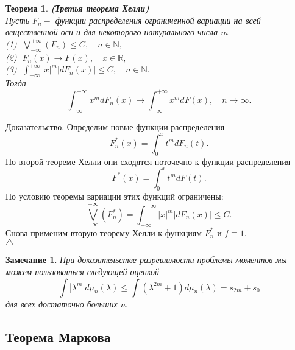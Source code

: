 \documentclass[12pt,a4paper]{article}
\theoremstyle{plain}   \newtheorem{Pro}{Задача}
\newtheorem{Rem}{Замечание}
\newtheorem{The}{Теорема}
\begin{document}
\begin{The}
{\bfseries (Третья теорема Хелли)}\\
Пусть
$ F_n - $
функции распределения ограниченной вариации на всей вещественной
оси и для некоторого натурального числа
$ m $ \\
(1) $ \; \bigvee _{-\infty}^{+\infty}(F_n ) \leq C,
\quad n \in \mathbb{N}, $\\
(2) $ \; F_n (x) \rightarrow F(x), \quad x \in \mathbb{R}, $ \\
(3) $ \; \int _{-\infty}^{+\infty}|x|^m |dF_n (x)| \leq C,
\quad n \in \mathbb{N}. $\\
Тогда
$$
  \int _{-\infty}^{+\infty} x^m dF_n (x) \rightarrow
  \int _{-\infty}^{+\infty} x^m dF(x), \quad n \rightarrow \infty .
$$
\end{The}
{\Large Доказательство.}
Определим новые функции распределения
$$
  F_n ^{\ast}(x)=\int _0 ^x t^m dF_n (t).
$$
По второй теореме Хелли они сходятся поточечно к функции распределения
$$
  F^{\ast}(x)=\int _0 ^x t^m dF(t).
$$
По условию теоремы вариации этих функций ограничены:
$$
  \bigvee _{-\infty}^{+\infty}(F_n ^{\ast})=
  \int _{-\infty}^{+\infty} |x|^m |dF_n (x)| \leq C.
$$
Снова применим вторую теорему Хелли к функциям
$ F_n ^{\ast} $
и
$ f \equiv 1 . $\\
$ \triangle $
\begin{Rem}
При доказательстве разрешимости проблемы моментов мы можем
пользоваться следующей оценкой
$$
  \int |\lambda ^m | d \mu _n (\lambda ) \leq
  \int (\lambda ^{2m}+1)d \mu _n (\lambda ) =
  s_{2m}+s_0
$$
для всех достаточно больших
$ n . $
\end{Rem}
\newpage
\subsection{Теорема Маркова}
$ \; $
\\
\end{document}
